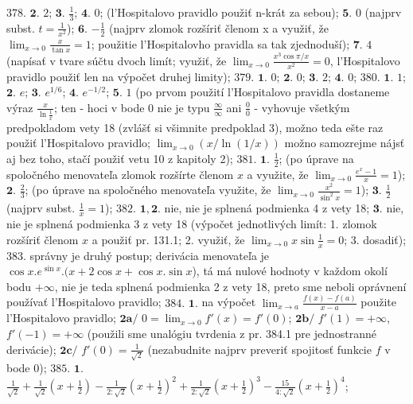 $\boxed{378.}$ $\boldsymbol{2.}$ $2$;
$\boldsymbol{3.}$ $\frac{1}{3}$;
$\boldsymbol{4.}$ $0$; (l'Hospitalovo pravidlo použiť n-krát za sebou);
$\boldsymbol{5.}$ $0$ (najprv subst. $t=\frac{1}{x^{2}}$);
$\boldsymbol{6.}$ $-\frac{1}{2}$ (najprv zlomok rozšíriť členom x a využiť, že $\lim_{x \to 0}\frac{x}{\tan x}=1$; použitie l'Hospitalovho pravidla sa tak zjednoduší);
$\boldsymbol{7.}$ $4$ (napísať v tvare súčtu dvoch limít; využiť, že $\lim_{x \to 0}\frac{x^{3}\cos \pi/x}{x^{2}}=0$, l'Hospitalovo pravidlo použiť len na výpočet druhej limity);
$\boxed{379.}$ $\boldsymbol{1.}$ $0$;
$\boldsymbol{2.}$ $0$;
$\boldsymbol{3.}$ $2$;
$\boldsymbol{4.}$ $0$;
$\boxed{380.}$ $\boldsymbol{1.}$ $1$;
$\boldsymbol{2.}$ $e$;
$\boldsymbol{3.}$ $e^{1/6}$;
$\boldsymbol{4.}$ $e^{-1/2}$;
$\boldsymbol{5.}$ $1$ (po prvom použití l'Hospitalovo pravidla dostaneme výraz $\frac{x}{\ln \frac{1}{x}}$; ten - hoci v bode $0$ nie je typu $\frac{\infty}{\infty}$ ani  $\frac{0}{0}$ - vyhovuje všetkým predpokladom vety 18 (zvlášť si všimnite predpoklad 3), možno teda ešte raz použiť l'Hospitalovo pravidlo; $\lim_{x \to 0}(x/\ln (1/x))$ možno samozrejme nájsť aj bez toho, stačí použiť vetu 10 z kapitoly 2);
$\boxed{381.}$ $\boldsymbol{1.}$ $\frac{1}{2}$; (po úprave na spoločného menovateľa zlomok rozšírte členom $x$ a využite, že  $\lim_{x \to 0}\frac{e^{x}-1}{x}=1$);
$\boldsymbol{2.}$ $\frac{2}{3}$; (po úprave na spoločného menovateľa  využite, že  $\lim_{x \to 0}\frac{x^{2}}{\sin ^{2}x}=1$);
$\boldsymbol{3.}$ $\frac{1}{2}$ (najprv subst. $\frac{1}{x}=1$);
$\boxed{382.}$ $\boldsymbol{1,2.}$ nie, nie je splnená podmienka 4 z vety 18;
$\boldsymbol{3.}$ nie, nie je splnená podmienka 3 z vety 18 (výpočet jednotlivých limít: 1. zlomok rozšíriť členom $x$ a použiť pr. 131.1; 2. využiť, že $\lim_{x \to 0}x\sin \frac{1}{x}=0$; 3. dosadiť);
$\boxed{383.}$ správny je druhý postup; derivácia menovateľa je $\cos x.e^{\sin x}.(x+2\cos x+\cos x.\sin x$), tá má nulové hodnoty v každom okolí bodu  $+\infty$, nie je teda splnená podmienka 2 z vety 18, preto sme neboli oprávnení používať  l'Hospitalovo pravidlo;
$\boxed{384.}$ $\boldsymbol{1.}$ na výpočet $\lim_{x \to a}\frac{f(x)-f(a)}{x-a}$ použite l'Hospitalovo pravidlo;
$\boldsymbol{2a/}$  $0=\lim_{x \to 0}f'(x)=f'(0)$;
$\boldsymbol{2b/}$  $f'(1)=+\infty$, $f'(-1)=+\infty$ (použili sme unalógiu tvrdenia z pr. 384.1 pre jednostranné derivácie);
$\boldsymbol{2c/}$  $f'(0)=\frac{1}{\sqrt{2}}$ (nezabudnite najprv preveriť spojitosť funkcie $f$ v bode 0);
$\boxed{385.}$ $\boldsymbol{1.}$ $\frac{1}{\sqrt{2}}+\frac{1}{\sqrt{2}}(x+\frac{1}{2})-\frac{1}{2:\sqrt{2}}(x+\frac{1}{2})^{2}+\frac{1}{2:\sqrt{2}}(x+\frac{1}{2})^{3}-\frac{15}{4:\sqrt{2}}(x+\frac{1}{2})^{4}$;
